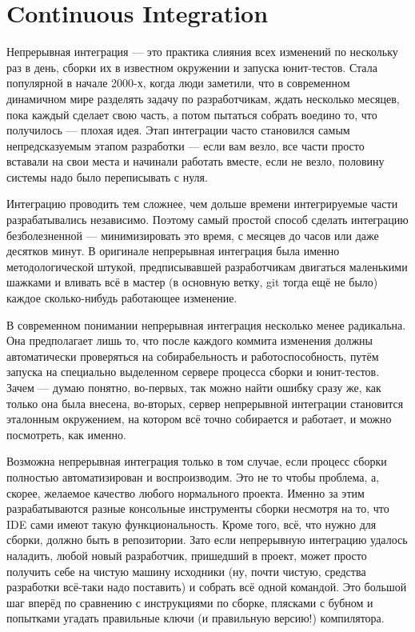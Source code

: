 \documentclass[a5paper]{article}
\begin{document}
\section{Continuous Integration}

Непрерывная интеграция --- это практика слияния всех изменений по нескольку раз в день, сборки их в известном окружении и запуска юнит-тестов. Стала популярной в начале 2000-х, когда люди заметили, что в современном динамичном мире разделять задачу по разработчикам, ждать несколько месяцев, пока каждый сделает свою часть, а потом пытаться собрать воедино то, что получилось --- плохая идея. Этап интеграции часто становился самым непредсказуемым этапом разработки --- если вам везло, все части просто вставали на свои места и начинали работать вместе, если не везло, половину системы надо было переписывать с нуля. 

Интеграцию проводить тем сложнее, чем дольше времени интегрируемые части разрабатывались независимо. Поэтому самый простой способ сделать интеграцию безболезненной --- минимизировать это время, с месяцев до часов или даже десятков минут. В оригинале непрерывная интеграция была именно методологической штукой, предписывавшей разработчикам двигаться маленькими шажками и вливать всё в мастер (в основную ветку, git тогда ещё не было) каждое сколько-нибудь работающее изменение.

В современном понимании непрерывная интеграция несколько менее радикальна. Она предполагает лишь то, что после каждого коммита изменения должны автоматически проверяться на собирабельность и работоспособность, путём запуска на специально выделенном сервере процесса сборки и юнит-тестов. Зачем --- думаю понятно, во-первых, так можно найти ошибку сразу же, как только она была внесена, во-вторых, сервер непрерывной интеграции становится эталонным окружением, на котором всё точно собирается и работает, и можно посмотреть, как именно. 

Возможна непрерывная интеграция только в том случае, если процесс сборки полностью автоматизирован и воспроизводим. Это не то чтобы проблема, а, скорее, желаемое качество любого нормального проекта. Именно за этим разрабатываются разные консольные инструменты сборки несмотря на то, что IDE сами имеют такую функциональность. Кроме того, всё, что нужно для сборки, должно быть в репозитории. Зато если непрерывную интеграцию удалось наладить, любой новый разработчик, пришедший в проект, может просто получить себе на чистую машину исходники (ну, почти чистую, средства разработки всё-таки надо поставить) и собрать всё одной командой. Это большой шаг вперёд по сравнению с инструкциями по сборке, плясками с бубном и попытками угадать правильные ключи (и правильную версию!) компилятора.
\end{document}
